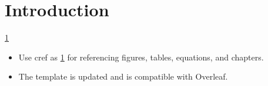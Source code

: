 \chapter{Introduction}\label{chapter1}
\cref{chapter1}

\begin{itemize}
    \item Use cref as \cref{chapter1} for referencing figures, tables, equations, and chapters.
    \item The template is updated and is compatible with Overleaf.
\end{itemize}